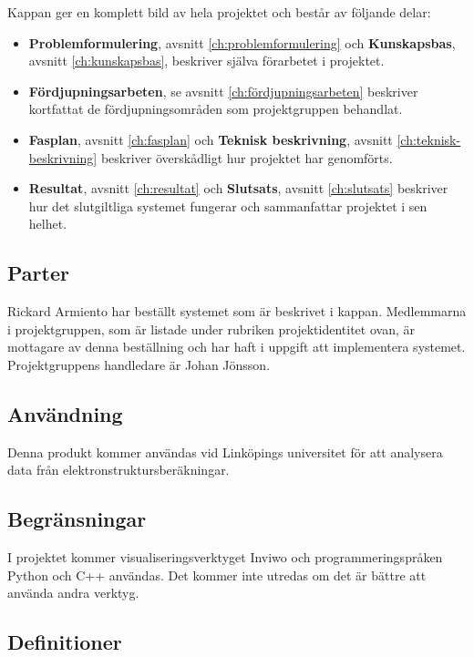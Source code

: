 \documentclass[a4paper,12pt]{article}
\begin{document}
Kappan ger en komplett bild av hela projektet och består av följande delar:

\begin{itemize}
	\item \textbf{Problemformulering}, avsnitt \ref{ch:problemformulering} och \textbf{Kunskapsbas}, avsnitt \ref{ch:kunskapsbas}, beskriver själva förarbetet i projektet.
	
	\item \textbf{Fördjupningsarbeten}, se avsnitt \ref{ch:fördjupningsarbeten} beskriver kortfattat de fördjupningsområden som projektgruppen behandlat.
	
	\item \textbf{Fasplan}, avsnitt \ref{ch:fasplan} och \textbf{Teknisk beskrivning}, avsnitt \ref{ch:teknisk-beskrivning} beskriver överskådligt hur projektet har genomförts.
	
	\item \textbf{Resultat}, avsnitt \ref{ch:resultat} och \textbf{Slutsats}, avsnitt \ref{ch:slutsats} beskriver hur det slutgiltliga systemet fungerar och sammanfattar projektet i sen helhet.
\end{itemize}

\subsection{Parter}
Rickard Armiento har beställt systemet som är beskrivet i kappan. Medlemmarna i projektgruppen, som är listade under rubriken projektidentitet ovan, är mottagare av denna beställning och har haft i uppgift att implementera systemet. Projektgruppens handledare är Johan Jönsson.


\subsection{Användning}
Denna produkt kommer användas vid Linköpings universitet för att analysera data från elektronstruktursberäkningar.

\subsection{Begränsningar}
I projektet kommer visualiseringsverktyget Inviwo och
programmeringspråken Python och C++ användas. Det kommer inte utredas
om det är bättre att använda andra verktyg.

\subsection{Definitioner}
\end{document}
